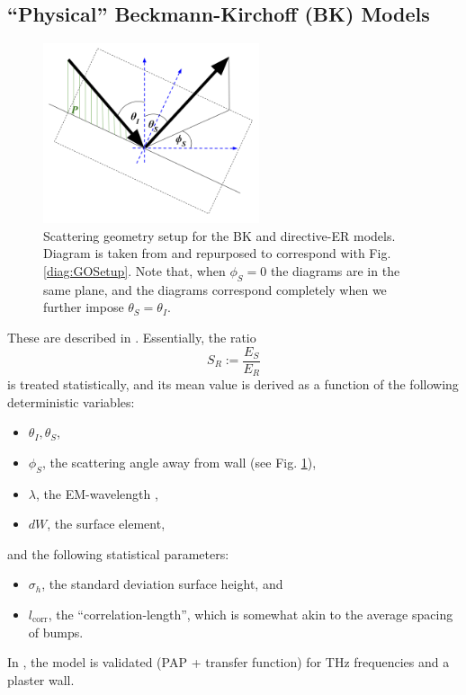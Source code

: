 \documentclass[lettersize,journal]{IEEEtran}
\begin{document}
\subsection{``Physical'' Beckmann-Kirchoff (BK) Models} \label{bkModels}
\begin{figure}[t]
\centering
\includegraphics[width=2.5in]{Beckmann Angles}
\captionsetup{singlelinecheck=off}
\caption[]{Scattering geometry setup for the BK and directive-ER models. Diagram is taken from \cite{ref:BK1} and repurposed to correspond with Fig. \ref{diag:GOSetup}. Note that, when $\phi_S=0$ the diagrams are in the same plane, and the diagrams correspond completely when we further impose $\theta_S=\theta_I$.} 
\label{diag:BeckmannAngles}
\end{figure}
These are described in \cite{ref:BK1,ref:BK2}. Essentially, the ratio 
\begin{equation*}
S_R := \frac{E_S}{E_R}
\end{equation*}
is treated statistically, and its mean value is derived as a function of the following deterministic variables:
\begin{itemize}
    \item $\theta_I, \theta_S$,
    \item $\phi_S$, the scattering angle away from wall (see Fig. \ref{diag:BeckmannAngles}),
    \item $\lambda$, the EM-wavelength ,
    \item $dW$, the surface element,
\end{itemize}
and the following statistical parameters:
\begin{itemize}
    \item $\sigma_h$, the standard deviation surface height, and
    \item $l_{\text{corr}}$, the ``correlation-length'', which is somewhat akin to the average spacing of bumps.
\end{itemize}

In \cite{ref:BK2, ref:BK3}, the model is validated (PAP + transfer function) for THz frequencies and a plaster wall. 
\end{document}
